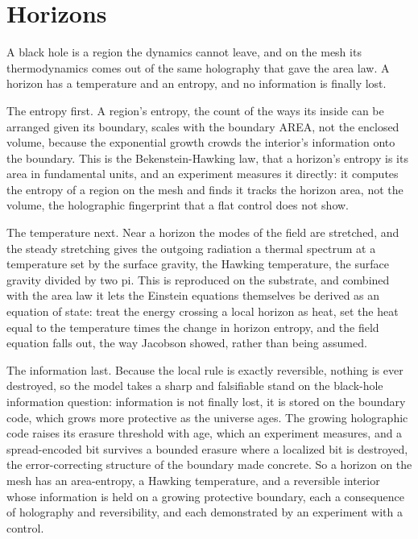 \section{Horizons}

A black hole is a region the dynamics cannot leave, and on the mesh its thermodynamics comes out of the same
holography that gave the area law. A horizon has a temperature and an entropy, and no information is finally lost.

The entropy first. A region's entropy, the count of the ways its inside can be arranged given its boundary, scales with
the boundary AREA, not the enclosed volume, because the exponential growth crowds the interior's information onto the
boundary. This is the Bekenstein-Hawking law, that a horizon's entropy is its area in fundamental units, and an
experiment measures it directly: it computes the entropy of a region on the mesh and finds it tracks the horizon
area, not the volume, the holographic fingerprint that a flat control does not show.

The temperature next. Near a horizon the modes of the field are stretched, and the steady stretching gives the outgoing
radiation a thermal spectrum at a temperature set by the surface gravity, the Hawking temperature, the surface gravity
divided by two pi. This is reproduced on the substrate, and combined with the area law it lets the Einstein equations
themselves be derived as an equation of state: treat the energy crossing a local horizon as heat, set the heat equal to
the temperature times the change in horizon entropy, and the field equation falls out, the way Jacobson showed, rather
than being assumed.

The information last. Because the local rule is exactly reversible, nothing is ever destroyed, so the model takes a
sharp and falsifiable stand on the black-hole information question: information is not finally lost, it is stored on the
boundary code, which grows more protective as the universe ages. The growing holographic code raises its erasure
threshold with age, which an experiment measures, and a spread-encoded bit survives a bounded erasure where a localized
bit is destroyed, the error-correcting structure of the boundary made concrete. So a horizon on the mesh has an
area-entropy, a Hawking temperature, and a reversible interior whose information is held on a growing protective
boundary, each a consequence of holography and reversibility, and each demonstrated by an experiment with a control.
